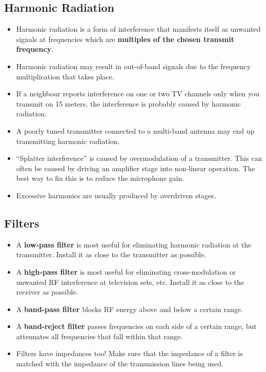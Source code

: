 \documentclass[letterpaper,12pt]{scrartcl}
\begin{document}
\subsection{Harmonic Radiation}

\begin{itemize}
\item Harmonic radiation is a form of interference that manifests itself as unwanted signals at frequencies which are \textbf{multiples of the chosen transmit frequency}.
\item Harmonic radiation may result in out-of-band signals due to the frequency multiplication that takes place.
\item If a neighbour reports interference on one or two TV channels only when you transmit on 15 meters, the interference is probably caused by harmonic radiation.
\item A poorly tuned transmitter connected to a multi-band antenna may end up transmitting harmonic radiation.
\item ``Splatter interference'' is caused by overmodulation of a transmitter. This can often be caused by driving an amplifier stage into non-linear operation. The best way to fix this is to reduce the microphone gain.
\item Excessive harmonics are usually produced by overdriven stages.
\end{itemize}

\subsection{Filters}

\begin{itemize}
\item A \textbf{low-pass filter} is most useful for eliminating harmonic radiation at the transmitter. Install it as close to the transmitter as possible.
\item A \textbf{high-pass filter} is most useful for eliminating cross-modulation or unwanted RF interference at television sets, etc. Install it as close to the receiver as possible.
\item A \textbf{band-pass filter} blocks RF energy above and below a certain range.
\item A \textbf{band-reject filter} passes frequencies on each side of a certain range, but attenuates all frequencies that fall within that range.
\item Filters have impedances too! Make sure that the impedance of a filter is matched with the impedance of the transmission lines being used.
\end{itemize}
\end{document}
